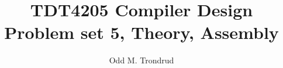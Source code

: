 \setlength{\headheight}{15pt} %
\setlength{\headsep}{30pt} %
\pagestyle{fancy} 

\title{TDT4205 Compiler Design\\
\textbf{Problem set 5, Theory, Assembly}}
\author{Odd M. Trondrud}

\chead{}


